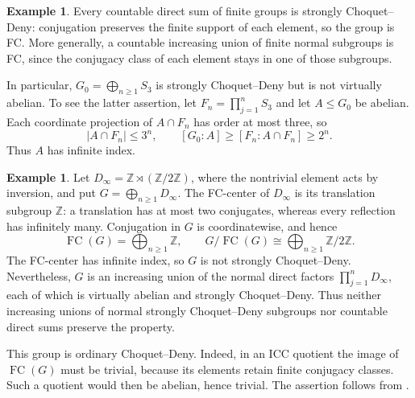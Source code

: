 \documentclass[11pt,letterpaper]{amsart}
\theoremstyle{definition}
\newtheorem{example}[theorem]{Example}
\theoremstyle{remark}
\newcommand{\Z}{\mathbb Z}
\DeclareMathOperator{\FC}{FC}
\begin{document}
\begin{example}\label{ex:finite-sum}
Every countable direct sum of finite groups is strongly Choquet--Deny:
conjugation preserves the finite support of each element, so the group
is FC. More generally, a countable increasing union of finite normal
subgroups is FC, since the conjugacy class of each element stays in
one of those subgroups.

In particular, $G_0=\bigoplus_{n\geq1}S_3$ is strongly Choquet--Deny
but is not virtually abelian. To see the latter assertion, let
$F_n=\prod_{j=1}^n S_3$ and let $A\leq G_0$ be abelian. Each coordinate
projection of $A\cap F_n$ has order at most three, so
\[
 |A\cap F_n|\leq3^n,\qquad
 [G_0:A]\geq[F_n:A\cap F_n]\geq2^n.
\]
Thus $A$ has infinite index.
\end{example}

\begin{example}\label{ex:dihedral}
Let $D_\infty=\Z\rtimes(\Z/2\Z)$, where the nontrivial element acts
by inversion, and put $G=\bigoplus_{n\geq1}D_\infty$.
The FC-center of $D_\infty$ is its translation subgroup $\Z$:
a translation has at most two conjugates, whereas every reflection
has infinitely many. Conjugation in $G$ is coordinatewise, and hence
\[
 \FC(G)=\bigoplus_{n\geq1}\Z,\qquad
 G/\FC(G)\cong\bigoplus_{n\geq1}\Z/2\Z.
\]
The FC-center has infinite index, so $G$ is not strongly Choquet--Deny.
Nevertheless, $G$ is an increasing union of the normal direct factors
$\prod_{j=1}^nD_\infty$, each of which is virtually abelian and strongly
Choquet--Deny. Thus neither increasing unions of normal strongly
Choquet--Deny subgroups nor countable direct sums preserve the property.

This group is ordinary Choquet--Deny. Indeed, in an ICC quotient the
image of $\FC(G)$ must be trivial, because its elements retain finite
conjugacy classes. Such a quotient would then be abelian, hence trivial.
The assertion follows from \cite[Theorem 1]{FHTVF}.
\end{example}
\end{document}
